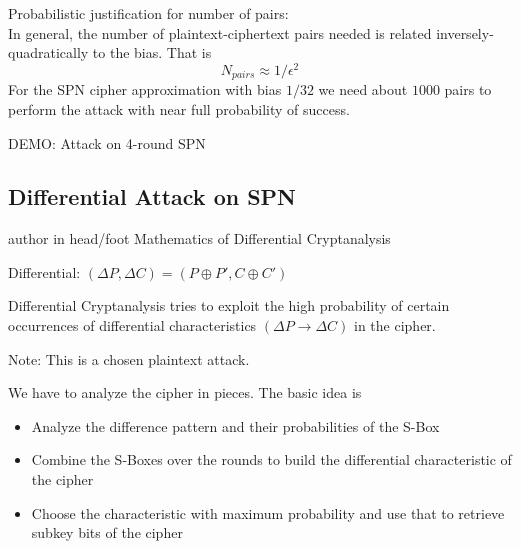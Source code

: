 \documentclass[9pt]{beamer}
\begin{document}
\begin{frame}
Probabilistic justification for number of pairs:\\
\vspace{5mm}
\pause In general, the number of plaintext-ciphertext pairs needed is related inversely-quadratically to the bias. That is
\[ N_{pairs} \approx 1 / \epsilon^2 \]
\pause For the SPN cipher approximation with bias $1/32$ we need about $1000$ pairs to perform the attack with near full probability of success.
\end{frame}

\begin{frame}
DEMO: Attack on 4-round SPN
\end{frame}

\subsection{Differential Attack on SPN}
\begin{frame}
\begin{beamercolorbox}[ht=2.5ex,dp=1.125ex,center,rounded=true,shadow=true]{author in head/foot}
Mathematics of Differential Cryptanalysis
\end{beamercolorbox}
\end{frame}

\begin{frame}
Differential: $(\Delta P, \Delta C) = (P \oplus P', C \oplus C')$

\vspace{5mm}
\pause Differential Cryptanalysis tries to exploit the high probability of certain occurrences of differential characteristics $(\Delta P \rightarrow \Delta C)$ in the cipher. 

\vspace{2mm}
\pause Note: This is a chosen plaintext attack.

\vspace{5mm}
\pause We have to analyze the cipher in pieces. \pause The basic idea is
\begin{itemize}[<+->]
\item{Analyze the difference pattern and their probabilities of the S-Box}
\item{Combine the S-Boxes over the rounds to build the differential characteristic of the cipher}
\item{Choose the characteristic with maximum probability and use that to retrieve subkey bits of the cipher}
\end{itemize}
\end{frame}
\end{document}
